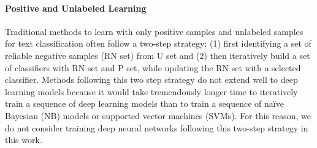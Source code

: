 



\paragraph{Positive and Unlabeled Learning}

Traditional methods to learn with only positive samples and unlabeled samples for text classification \cite{liu2003building,li2005learning} often follow a two-step strategy: (1) first identifying a set of reliable negative samples (RN set) from U set and (2) then iteratively build a set of classifiers with RN set and P set, while updating the RN set with a selected classifier.
Methods following this two step strategy do not extend well to deep learning models because it would take tremendously longer time to iteratively train a sequence of deep learning models than to train a sequence of na\"ive Bayesian (NB) models or supported vector machines (SVMs).
For this reason, we do not consider training deep neural networks following this two-step strategy in this work.

